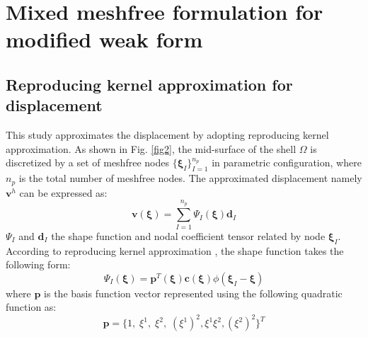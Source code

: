 \section{Mixed meshfree formulation for modified \DIFdelbegin {}\DIFdelend \DIFaddbegin {}\DIFaddend weak form}\label{mixed}
\subsection{Reproducing kernel approximation for displacement}
This study approximates the displacement by adopting reproducing kernel approximation. As shown in Fig. \ref{fig2}, the mid-surface of the shell $\Omega$ is discretized by a set of meshfree nodes $\{\boldsymbol \xi_I\}_{I=1}^{n_p}$ in parametric configuration, where $n_p$ is the total number of meshfree nodes. The approximated displacement namely $\boldsymbol v^h$ can be expressed as:
\begin{equation}\label{approxv}
\boldsymbol v(\boldsymbol \xi) = \sum_{I=1}^{n_p} \Psi_I(\boldsymbol \xi) \boldsymbol d_I
\end{equation}
\DIFdelbegin {}\DIFdelend \DIFaddbegin {}\DIFaddend $\Psi_I$ and $\boldsymbol d_I$ \DIFdelbegin {}\DIFdelend \DIFaddbegin {}\DIFaddend the shape function and nodal coefficient tensor related by node $\boldsymbol \xi_I$. 
According to reproducing kernel approximation \cite{liu1995}, the shape function takes the following form:
\begin{equation}
\Psi_I(\boldsymbol \xi) = \boldsymbol p^T(\boldsymbol \xi) \boldsymbol c(\boldsymbol \xi) \phi(\boldsymbol \xi_I - \boldsymbol \xi)
\end{equation}
where $\boldsymbol p$ is the basis function vector represented using the following quadratic function as:
\begin{equation}
        \boldsymbol p = \{1,\;\xi^1,\;\xi^2,\;(\xi^1)^2,\xi^1\xi^2,(\xi^2)^2\}^T
\end{equation}

